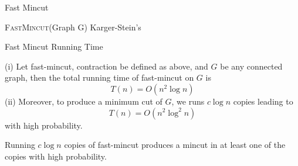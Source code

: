 \begin{frame}[fragile]{Fast Mincut \cite{Baswana_Sen}}
    \begin{algorithm}[H]
      \caption{\textsc{FastMincut}(Graph G) Karger-Stein's}
      \begin{algorithmic}
            \Else
            \EndIf
            
      \end{algorithmic}
      \end{algorithm}
\end{frame}

\begin{frame}{Fast Mincut Running Time}
    \setlength{\abovedisplayskip}{0pt} 
    \setlength{\belowdisplayskip}{5pt}
    \setlength{\abovedisplayshortskip}{0pt}
    \setlength{\belowdisplayshortskip}{5pt}
    \begin{theorem}
        \label{fast-mincut-running-time}
        (i) Let fast-mincut, contraction be defined as above, and $G$ be any connected graph, then the total running time of fast-mincut on $G$ is
        \[T(n) = O(n^2\log{n})\]
        (ii) Moreover, to produce a minimum cut of $G$, we runs $c\log{n}$ copies leading to
        \[T(n) = O(n^2\log^2{n})\]
        with high probability.
    \end{theorem}
    \begin{theorem}
        \label{minimum-cut-prob}
        Running $c\log{n}$ copies of fast-mincut produces a mincut in at least one of the copies with high probability. 
    \end{theorem}
\end{frame}

